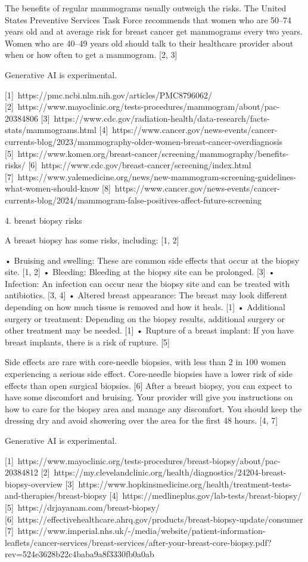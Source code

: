 The benefits of regular mammograms usually outweigh the risks. The United States Preventive Services Task Force recommends that women who are 50–74 years old and at average risk for breast cancer get mammograms every two years. Women who are 40–49 years old should talk to their healthcare provider about when or how often to get a mammogram. [2, 3]  

Generative AI is experimental.

[1] https://pmc.ncbi.nlm.nih.gov/articles/PMC8796062/
[2] https://www.mayoclinic.org/tests-procedures/mammogram/about/pac-20384806
[3] https://www.cdc.gov/radiation-health/data-research/facts-stats/mammograms.html
[4] https://www.cancer.gov/news-events/cancer-currents-blog/2023/mammography-older-women-breast-cancer-overdiagnosis
[5] https://www.komen.org/breast-cancer/screening/mammography/benefits-risks/
[6] https://www.cdc.gov/breast-cancer/screening/index.html
[7] https://www.yalemedicine.org/news/new-mammogram-screening-guidelines-what-women-should-know
[8] https://www.cancer.gov/news-events/cancer-currents-blog/2024/mammogram-false-positives-affect-future-screening

4. breast biopsy risks

A breast biopsy has some risks, including: [1, 2]  

• Bruising and swelling: These are common side effects that occur at the biopsy site. [1, 2]  
• Bleeding: Bleeding at the biopsy site can be prolonged. [3]  
• Infection: An infection can occur near the biopsy site and can be treated with antibiotics. [3, 4]  
• Altered breast appearance: The breast may look different depending on how much tissue is removed and how it heals. [1]  
• Additional surgery or treatment: Depending on the biopsy results, additional surgery or other treatment may be needed. [1]  
• Rupture of a breast implant: If you have breast implants, there is a risk of rupture. [5]  

Side effects are rare with core-needle biopsies, with less than 2 in 100 women experiencing a serious side effect. Core-needle biopsies have a lower risk of side effects than open surgical biopsies. [6]  
After a breast biopsy, you can expect to have some discomfort and bruising. Your provider will give you instructions on how to care for the biopsy area and manage any discomfort. You should keep the dressing dry and avoid showering over the area for the first 48 hours. [4, 7]  

Generative AI is experimental.

[1] https://www.mayoclinic.org/tests-procedures/breast-biopsy/about/pac-20384812
[2] https://my.clevelandclinic.org/health/diagnostics/24204-breast-biopsy-overview
[3] https://www.hopkinsmedicine.org/health/treatment-tests-and-therapies/breast-biopsy
[4] https://medlineplus.gov/lab-tests/breast-biopsy/
[5] https://drjayanam.com/breast-biopsy/
[6] https://effectivehealthcare.ahrq.gov/products/breast-biopsy-update/consumer
[7] https://www.imperial.nhs.uk/-/media/website/patient-information-leaflets/cancer-services/breast-services/after-your-breast-core-biopsy.pdf?rev=524e3628b22c4baba9a8f3330fb0a0ab

